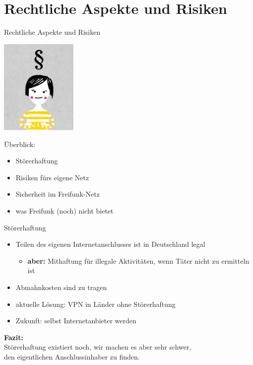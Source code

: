 \documentclass{beamer}
\begin{document}
\section{Rechtliche Aspekte und Risiken}
\begin{frame}{Rechtliche Aspekte und Risiken}
\begin{Row}
\begin{Cell}{1}
\vspace{0.1cm}
\includegraphics[width=3.7cm]{images/recht}
\end{Cell}
\begin{Cell}{2}
\vspace{1cm}
Überblick:
\begin{itemize}
\pause \item Störerhaftung
\pause \item Risiken fürs eigene Netz
\pause \item Sicherheit im Freifunk-Netz
\pause \item was Freifunk (noch) nicht bietet
\end{itemize}
\end{Cell}
\end{Row}
\end{frame}

\begin{frame}{Störerhaftung}
\begin{itemize}
\pause\item Teilen des eigenen Internetanschlusses ist in Deutschland legal
\begin{itemize}
	\pause\item \textbf{aber:} Mithaftung für illegale Aktivitäten, wenn Täter nicht zu ermitteln ist
\end{itemize}
\pause\item Abmahnkosten sind zu tragen
\vfill
\pause\item aktuelle Lösung: VPN in Länder ohne Störerhaftung
\pause\item Zukunft: selbst Internetanbieter werden
\end{itemize}
\vfill
\centering
\pause \textbf{Fazit:}\\Störerhaftung existiert noch, wir machen es aber sehr schwer,\\den eigentlichen Anschlussinhaber zu finden.

\end{frame}
\end{document}
